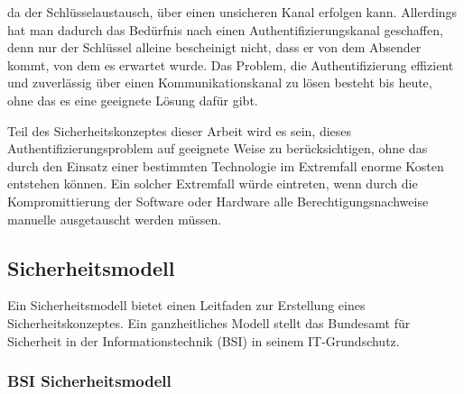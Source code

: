\documentclass[11pt,a4paper]{report}
\begin{document}
da der Schlüsselaustausch, über einen unsicheren Kanal erfolgen kann. Allerdings hat man dadurch das Bedürfnis nach einen Authentifizierungskanal geschaffen, denn nur der Schlüssel alleine bescheinigt nicht, dass er von dem Absender kommt, von dem es erwartet wurde. Das Problem, die Authentifizierung effizient und zuverlässig über einen Kommunikationskanal zu lösen besteht bis heute, ohne das es eine geeignete Lösung dafür gibt. 

Teil des Sicherheitskonzeptes dieser Arbeit wird es sein, dieses Authentifizierungsproblem auf geeignete Weise zu berücksichtigen, ohne das durch den Einsatz einer bestimmten Technologie im Extremfall enorme Kosten entstehen können. Ein solcher Extremfall würde eintreten, wenn durch die Kompromittierung der Software oder Hardware alle Berechtigungsnachweise manuelle ausgetauscht werden müssen.

\subsection{Sicherheitsmodell}

Ein Sicherheitsmodell bietet einen Leitfaden zur Erstellung eines Sicherheitskonzeptes. Ein ganzheitliches Modell stellt das Bundesamt für Sicherheit in der Informationstechnik (BSI) in seinem IT-Grund\-schutz.  

\subsubsection{BSI Sicherheitsmodell}
\end{document}
